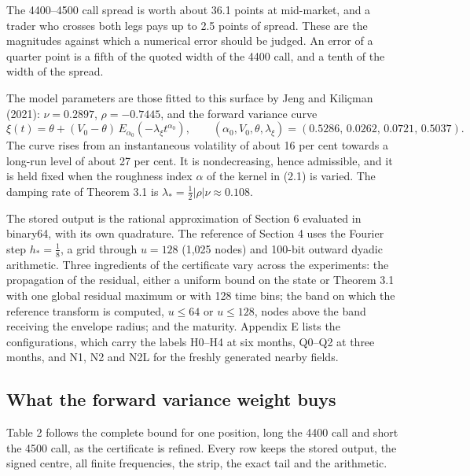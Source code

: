 \documentclass[11pt,a4paper]{article}
\begin{document}
The 4400–4500 call spread is worth about 36.1 points at mid-market, and a trader who crosses both legs pays up to 2.5 points of spread. These are the magnitudes against which a numerical error should be judged. An error of a quarter point is a fifth of the quoted width of the 4400 call, and a tenth of the width of the spread.

The model parameters are those fitted to this surface by Jeng and Kiliçman (2021): \(\nu=0.2897\), \(\rho=-0.7445\), and the forward variance curve
\begin{equation*}\tag{7.1}
\xi(t)=\theta+(V_0-\theta)\,E_{\alpha_0}\left(-\lambda_\xi t^{\alpha_0}\right),\qquad(\alpha_0,V_0,\theta,\lambda_\xi)=(0.5286,\,0.0262,\,0.0721,\,0.5037).
\end{equation*}
The curve rises from an instantaneous volatility of about 16 per cent towards a long-run level of about 27 per cent. It is nondecreasing, hence admissible, and it is held fixed when the roughness index \(\alpha\) of the kernel in (2.1) is varied. The damping rate of Theorem 3.1 is \(\lambda_*=\tfrac12|\rho|\nu\approx0.108\).

The stored output is the rational approximation of Section 6 evaluated in binary64, with its own quadrature. The reference of Section 4 uses the Fourier step \(h_*=\tfrac18\), a grid through \(u=128\) (1,025 nodes) and 100-bit outward dyadic arithmetic. Three ingredients of the certificate vary across the experiments: the propagation of the residual, either a uniform bound on the state or Theorem 3.1 with one global residual maximum or with 128 time bins; the band on which the reference transform is computed, \(u\le64\) or \(u\le128\), nodes above the band receiving the envelope radius; and the maturity. Appendix E lists the configurations, which carry the labels H0–H4 at six months, Q0–Q2 at three months, and N1, N2 and N2L for the freshly generated nearby fields.

\setcounter{subsection}{1}\subsection{What the forward variance weight buys}

Table 2 follows the complete bound for one position, long the 4400 call and short the 4500 call, as the certificate is refined. Every row keeps the stored output, the signed centre, all finite frequencies, the strip, the exact tail and the arithmetic.
\end{document}
